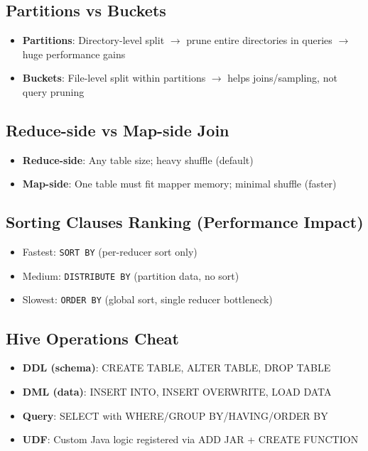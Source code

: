 \documentclass[11pt, onecolumn, a4paper]{article}
\begin{document}
\subsection{Partitions vs Buckets}

\begin{itemize}
  \item \textbf{Partitions}: Directory-level split $\rightarrow$ prune entire directories in queries $\rightarrow$ huge performance gains
  \item \textbf{Buckets}: File-level split within partitions $\rightarrow$ helps joins/sampling, not query pruning
\end{itemize}

\subsection{Reduce-side vs Map-side Join}

\begin{itemize}
  \item \textbf{Reduce-side}: Any table size; heavy shuffle (default)
  \item \textbf{Map-side}: One table must fit mapper memory; minimal shuffle (faster)
\end{itemize}

\subsection{Sorting Clauses Ranking (Performance Impact)}

\begin{itemize}
  \item Fastest: \texttt{SORT BY} (per-reducer sort only)
  \item Medium: \texttt{DISTRIBUTE BY} (partition data, no sort)
  \item Slowest: \texttt{ORDER BY} (global sort, single reducer bottleneck)
\end{itemize}

\subsection{Hive Operations Cheat}

\begin{itemize}
  \item \textbf{DDL (schema)}: CREATE TABLE, ALTER TABLE, DROP TABLE
  \item \textbf{DML (data)}: INSERT INTO, INSERT OVERWRITE, LOAD DATA
  \item \textbf{Query}: SELECT with WHERE/GROUP BY/HAVING/ORDER BY
  \item \textbf{UDF}: Custom Java logic registered via ADD JAR + CREATE FUNCTION
\end{itemize}
\end{document}
